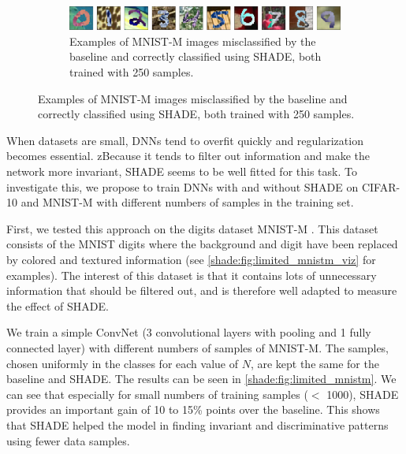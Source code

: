 \begin{figure}[tb]
            \vspace{5mm}
            \begin{subfigure}[t]{0.85\textwidth}
                \centering
                \includegraphics[width=\textwidth]{images/shade_MNISTM_samples.pdf}
                \caption{Examples of MNIST-M images misclassified by the baseline and correctly classified using SHADE, both trained with 250 samples.}
                \label{shade:fig:limited_mnistm_viz}
            \end{subfigure}
            
            \label{shade:fig:limited_dataset}
        \end{figure}
        
        When datasets are small, \acp{DNN} tend to overfit quickly and regularization becomes essential. zBecause it tends to filter out information and make the network more invariant, \ac{SHADE} seems to be well fitted for this task. To investigate this, we propose to train \acp{DNN} with and without \ac{SHADE} on CIFAR-10 and MNIST-M with different numbers of samples in the training set.
        
        First, we tested this approach on the digits dataset MNIST-M \citep{ganin2015unsupervised}. This dataset consists of the MNIST digits where the background and digit have been replaced by colored and textured information (see \autoref{shade:fig:limited_mnistm_viz} for examples). The interest of this dataset is that it contains lots of unnecessary information that should be filtered out, and is therefore well adapted to measure the effect of \ac{SHADE}.
        
        We train a simple \ac{ConvNet} (3 convolutional layers with pooling and 1 fully connected layer) with different numbers of samples of MNIST-M. The samples, chosen uniformly in the classes for each value of $N$, are kept the same for the baseline and \ac{SHADE}. The results can be seen in \autoref{shade:fig:limited_mnistm}. We can see that especially for small numbers of training samples ($<$ 1000), \ac{SHADE} provides an important gain of 10 to 15\% points over the baseline. This shows that SHADE helped the model in finding invariant and discriminative patterns using fewer data samples.
        
